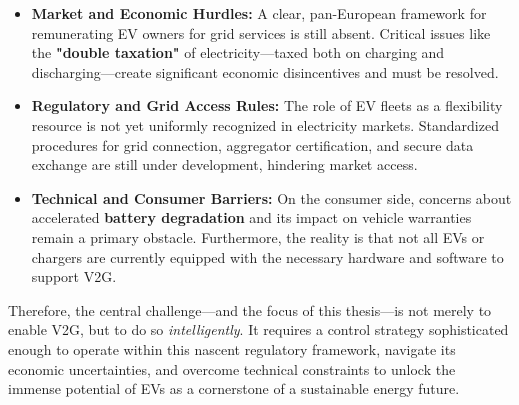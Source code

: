 \begin{itemize}
    \item \textbf{Market and Economic Hurdles:} A clear, pan-European framework for remunerating EV owners for grid services is still absent. Critical issues like the \textbf{"double taxation"} of electricity—taxed both on charging and discharging—create significant economic disincentives and must be resolved.
    \item \textbf{Regulatory and Grid Access Rules:} The role of EV fleets as a flexibility resource is not yet uniformly recognized in electricity markets. Standardized procedures for grid connection, aggregator certification, and secure data exchange are still under development, hindering market access.
    \item \textbf{Technical and Consumer Barriers:} On the consumer side, concerns about accelerated \textbf{battery degradation} and its impact on vehicle warranties remain a primary obstacle. Furthermore, the reality is that not all EVs or chargers are currently equipped with the necessary hardware and software to support V2G.
\end{itemize}
Therefore, the central challenge—and the focus of this thesis—is not merely to enable V2G, but to do so \textit{intelligently}. It requires a control strategy sophisticated enough to operate within this nascent regulatory framework, navigate its economic uncertainties, and overcome technical constraints to unlock the immense potential of EVs as a cornerstone of a sustainable energy future.

